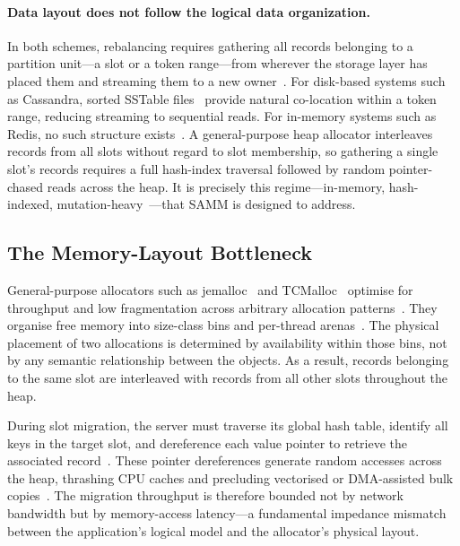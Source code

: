 \paragraph{Data layout does not follow the logical data organization.}
In both schemes, rebalancing requires gathering all records belonging to a partition unit---a slot or a token range---from wherever the storage layer has placed them and streaming them to a new owner~\cite{rocksteady,netmigrate}. For disk-based systems such as Cassandra, sorted SSTable files~\cite{bigtable} provide natural co-location within a token range, reducing streaming to sequential reads. For in-memory systems such as Redis, no such structure exists~\cite{mica,memc3}. A general-purpose heap allocator interleaves records from all slots without regard to slot membership, so gathering a single slot's records requires a full hash-index traversal followed by random pointer-chased reads across the heap. It is precisely this regime---in-memory, hash-indexed, mutation-heavy~\cite{atikoglu-kv-workload,yang-twitter-cache,scaling-memcache}---that SAMM is designed to address.

\subsection{The Memory-Layout Bottleneck}
\label{sec:layout-bottleneck}

General-purpose allocators such as jemalloc~\cite{jemalloc} and TCMalloc~\cite{tcmalloc} optimise for throughput and low fragmentation across arbitrary allocation patterns~\cite{rumble-log-memory}. They organise free memory into size-class bins and per-thread arenas~\cite{hoard_paper}. The physical placement of two allocations is determined by availability within those bins, not by any semantic relationship between the objects. As a result, records belonging to the same slot are interleaved with records from all other slots throughout the heap.

During slot migration, the server must traverse its global hash table, identify all keys in the target slot, and dereference each value pointer to retrieve the associated record~\cite{rocksteady}. These pointer dereferences generate random accesses across the heap, thrashing CPU caches and precluding vectorised or DMA-assisted bulk copies~\cite{kvdirect,lite-rdma}. The migration throughput is therefore bounded not by network bandwidth but by memory-access latency---a fundamental impedance mismatch between the application's logical model and the allocator's physical layout.

